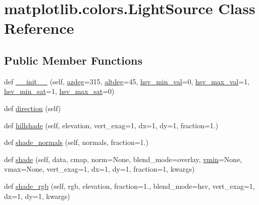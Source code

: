 \hypertarget{classmatplotlib_1_1colors_1_1LightSource}{}\section{matplotlib.\+colors.\+Light\+Source Class Reference}
\label{classmatplotlib_1_1colors_1_1LightSource}
\subsection*{Public Member Functions}
\begin{DoxyCompactItemize}
\item 
def \hyperlink{classmatplotlib_1_1colors_1_1LightSource_a40db8291ed06130afff9f8b4dfc99ed5}{\+\_\+\+\_\+init\+\_\+\+\_\+} (self, \hyperlink{classmatplotlib_1_1colors_1_1LightSource_a882cb0069579a96b1cbee030da7e6dcf}{azdeg}=315, \hyperlink{classmatplotlib_1_1colors_1_1LightSource_a2777dfac6339c6a79f36de3caa2f81de}{altdeg}=45, \hyperlink{classmatplotlib_1_1colors_1_1LightSource_aa1fa26d6651f24ebd79c5faa0ab204b0}{hsv\+\_\+min\+\_\+val}=0, \hyperlink{classmatplotlib_1_1colors_1_1LightSource_a5471de9515029d4224f86972aa459e81}{hsv\+\_\+max\+\_\+val}=1, \hyperlink{classmatplotlib_1_1colors_1_1LightSource_af935fb94e31a3e49d91816818fcc078f}{hsv\+\_\+min\+\_\+sat}=1, \hyperlink{classmatplotlib_1_1colors_1_1LightSource_af495af78687fda8abd0c4a94b9ebb7ac}{hsv\+\_\+max\+\_\+sat}=0)
\item 
def \hyperlink{classmatplotlib_1_1colors_1_1LightSource_a2ad08bc8b71ed120352b6afc1a3d6299}{direction} (self)
\item 
def \hyperlink{classmatplotlib_1_1colors_1_1LightSource_a5e4963ea3c81293011cd6a1fb337f1f8}{hillshade} (self, elevation, vert\+\_\+exag=1, dx=1, dy=1, fraction=1.)
\item 
def \hyperlink{classmatplotlib_1_1colors_1_1LightSource_a467508ec8a8aba2145df2209faf360c9}{shade\+\_\+normals} (self, normals, fraction=1.)
\item 
def \hyperlink{classmatplotlib_1_1colors_1_1LightSource_afb47b7b28c92dd87ec518dd671863e20}{shade} (self, data, cmap, norm=None, blend\+\_\+mode=\textquotesingle{}overlay\textquotesingle{}, \hyperlink{namespacematplotlib_1_1colors_a64fab219e2255adac7821722f85263bf}{vmin}=None, vmax=None, vert\+\_\+exag=1, dx=1, dy=1, fraction=1, kwargs)
\item 
def \hyperlink{classmatplotlib_1_1colors_1_1LightSource_a0da23fa89436a964e61cedab112b47af}{shade\+\_\+rgb} (self, rgb, elevation, fraction=1., blend\+\_\+mode=\textquotesingle{}hsv\textquotesingle{}, vert\+\_\+exag=1, dx=1, dy=1, kwargs)

\end{DoxyCompactItemize}
